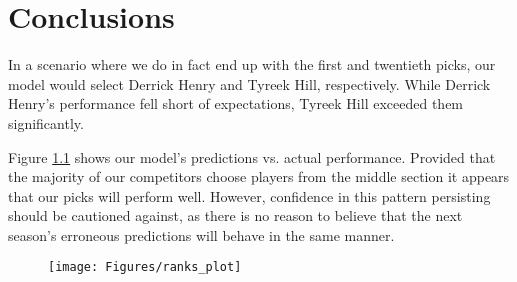 \chapter{Conclusions}
\label{ch:conclusion}
\glsresetall

In a scenario where we do in fact end up with the first and twentieth picks, our model would select Derrick Henry and Tyreek Hill, respectively. While Derrick Henry's performance fell short of expectations, Tyreek Hill exceeded them significantly.

Figure \ref{fig:ranksplot} shows our model's predictions vs. actual performance. Provided that the majority of our competitors choose players from the middle section it appears that our picks will perform well. However, confidence in this pattern persisting should be cautioned against, as there is no reason to believe that the next season's erroneous predictions will behave in the same manner.

\begin{figure}[h]
	\centering
	\texttt{[image: Figures/ranks\_plot]}
	\caption{}
	\label{fig:ranksplot}
\end{figure}


